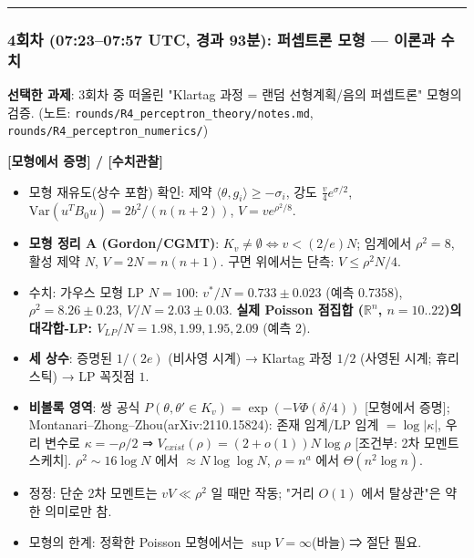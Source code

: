 \begin{center}\rule{0.5\linewidth}{0.5pt}\end{center}

\hypertarget{uxd68cuxcc28-07230757-utc-uxacbduxacfc-93uxbd84-uxd37cuxc149uxd2b8uxb860-uxbaa8uxd615-uxc774uxb860uxacfc-uxc218uxce58}{%
\subsubsection*{4회차 (07:23--07:57 UTC, 경과 93분): 퍼셉트론 모형 --- 이론과 수치}\label{uxd68cuxcc28-07230757-utc-uxacbduxacfc-93uxbd84-uxd37cuxc149uxd2b8uxb860-uxbaa8uxd615-uxc774uxb860uxacfc-uxc218uxce58}}

\textbf{선택한 과제}: 3회차 중 떠올린 "Klartag 과정 = 랜덤 선형계획/음의 퍼셉트론" 모형의 검증. (노트: \texttt{rounds/R4\_perceptron\_theory/notes.md}, \texttt{rounds/R4\_perceptron\_numerics/})

\textbf{{[}모형에서 증명{]} / {[}수치관찰{]}}

\begin{itemize}
\tightlist
\item
  모형 재유도(상수 포함) 확인: 제약 \(\langle\theta,g_i\rangle\ge-\sigma_i\), 강도 \(\frac v4e^{\sigma/2}\), \(\mathrm{Var}(u^TB_0u)=2b^2/(n(n+2))\), \(V=ve^{\rho^2/8}\).
\item
  \textbf{모형 정리 A (Gordon/CGMT)}: \(K_v\neq\emptyset\iff v<(2/e)N\); 임계에서 \(\rho^2=8\), 활성 제약 \(N\), \(V=2N=n(n+1)\). 구면 위에서는 단측: \(V\le\rho^2N/4\).
\item
  수치: 가우스 모형 LP \(N=100\): \(v^*/N=0.733\pm0.023\) (예측 0.7358), \(\rho^2=8.26\pm0.23\), \(V/N=2.03\pm0.03\). \textbf{실제 Poisson 점집합 (\(\mathbb R^n\), \(n=10..22\))의 대각합-LP: \(V_{LP}/N=1.98,1.99,1.95,2.09\)} (예측 2).
\item
  \textbf{세 상수}: 증명된 \(1/(2e)\) (비사영 시계) → Klartag 과정 \(1/2\) (사영된 시계; 휴리스틱) → LP 꼭짓점 \(1\).
\item
  \textbf{비볼록 영역}: 쌍 공식 \(P(\theta,\theta'\in K_v)=\exp(-V\Phi(\delta/4))\) {[}모형에서 증명{]}; Montanari--Zhong--Zhou(arXiv:2110.15824): 존재 임계/LP 임계 \(=\log|\kappa|\), 우리 변수로 \(\kappa=-\rho/2\) ⇒ \textbf{\(V_{exist}(\rho)=(2+o(1))N\log\rho\)} {[}조건부: 2차 모멘트 스케치{]}. \(\rho^2\sim16\log N\) 에서 \(\approx N\log\log N\), \(\rho=n^a\) 에서 \(\Theta(n^2\log n)\).
\item
  정정: 단순 2차 모멘트는 \(vV\ll\rho^2\) 일 때만 작동; "거리 \(O(1)\) 에서 탈상관"은 약한 의미로만 참.
\item
  모형의 한계: 정확한 Poisson 모형에서는 \(\sup V=\infty\)(바늘) ⇒ 절단 필요.
\end{itemize}

